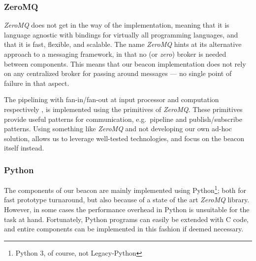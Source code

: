 \subsubsection{ZeroMQ}
\textit{ZeroMQ} does not get in the way of the implementation, meaning that it is language agnostic with bindings for virtually all programming languages, and that it is fast, flexible, and scalable.
The name \textit{ZeroMQ} hints at its alternative approach to a messaging framework, in that no (or \textit{zero}) broker is needed between components.
This means that our beacon implementation does not rely on any centralized broker for passing around messages --- no single point of failure in that aspect.


The pipelining with fan-in/fan-out at input processor and computation respectively , is implemented using the primitives of \textit{ZeroMQ}.
These primitives provide useful patterns for communication, e.g.\ pipeline and publish/subscribe patterns.
Using something like \textit{ZeroMQ} and not developing our own ad-hoc solution, allows us to leverage well-tested technologies, and focus on the beacon itself instead.

\subsubsection{Python}
The components of our beacon are mainly implemented using Python\footnote{Python 3, of course, not Legacy-Python}; both for fast prototype turnaround, but also because of a state of the art \textit{ZeroMQ} library.
However, in some cases the performance overhead in Python is unsuitable for the task at hand.
Fortunately, Python programs can easily be extended with C code, and entire components can be implemented in this fashion if deemed necessary.
